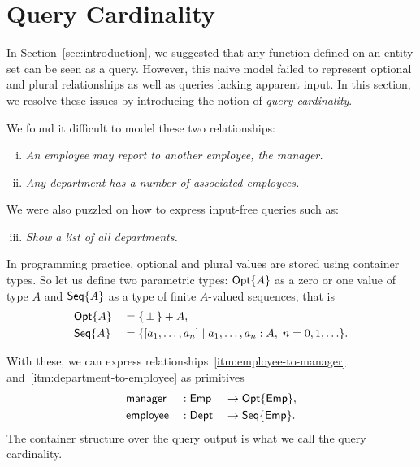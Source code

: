 
\section{Query Cardinality}
\label{sec:cardinality}

In Section~\ref{sec:introduction}, we suggested that any function defined on an
entity set can be seen as a query.  However, this naive model failed to
represent optional and plural relationships as well as queries lacking apparent
input.  In this section, we resolve these issues by introducing the notion of
\emph{query cardinality}.

We found it difficult to model these two relationships:

\begin{enumerate}[(i)]
\item \label{itm:employee-to-manager}
\emph{An employee may report to another employee, the manager.}

\item \label{itm:department-to-employee}
\emph{Any department has a number of associated employees.}
\end{enumerate}

We were also puzzled on how to express input-free queries such as:

\begin{enumerate}[(i)]
\setcounter{enumi}{2}
\item \label{itm:department-set}
\emph{Show a list of all departments.}
\end{enumerate}

In programming practice, optional and plural values are stored using container
types.  So let us define two parametric types: $\mathsf{Opt}{\left\{A\right\}}$ as a zero or one value
of type $A$ and $\mathsf{Seq}{\left\{A\right\}}$ as a type of finite $A$-valued sequences, that is
\begin{alignat*}{2}
    & \mathsf{Opt}{\left\{A\right\}} && = \{\, \bot \,\} + A, \\
    & \mathsf{Seq}{\left\{A\right\}} && = \{[a_1,\ldots,a_n] \mid a_1,\ldots,a_n:A,\; n=0,1,\ldots \}.
\end{alignat*}

With these, we can express relationships~\ref{itm:employee-to-manager}
and~\ref{itm:department-to-employee} as primitives
\begin{alignat*}{3}
    & \mathsf{manager} && : \mathsf{Emp} && \to \mathsf{Opt}{\left\{\mathsf{Emp}\right\}}, \\
    & \mathsf{employee} && : \mathsf{Dept} && \to \mathsf{Seq}{\left\{\mathsf{Emp}\right\}}.
\end{alignat*}
The container structure over the query output is what we call the query
cardinality.

